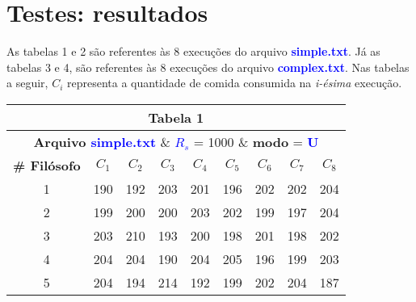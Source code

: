 \documentclass[11pt]{article}
\begin{document}
\section{Testes: resultados}

As tabelas 1 e 2 são referentes às 8 execuções do arquivo \textbf{\textcolor{blue}{simple.txt}}. Já as tabelas 3 e 4, são referentes às 8 execuções do arquivo \textbf{\textcolor{blue}{complex.txt}}. Nas tabelas a seguir, \textbf{$C_i$} representa a quantidade de comida consumida na \textit{i-ésima} execução.

\begin{table}[!h]
	\begin{center}
		\begin{tabular}{| c | c | c | c | c | c | c | c | c |}
		\hline
		\multicolumn{9}{|c|}{\textbf{Tabela 1}} \\ \hline
		\multicolumn{9}{|c|}{\textbf{Arquivo \textcolor{blue}{simple.txt}} \& \textbf{\textcolor{blue}{$R_s$}} = 1000 \& \textbf{modo} = \textbf{\textcolor{blue}{U}}} \\
		\hline
			\textbf{\# Filósofo} & \textbf{$C_1$} & \textbf{$C_2$} & \textbf{$C_3$} & \textbf{$C_4$} & \textbf{$C_5$} & \textbf{$C_6$} & \textbf{$C_7$} & \textbf{$C_8$} \\ \hline
			1 & 190 & 192 & 203 & 201 & 196 & 202 & 202 & 204 \\ \hline
			2 & 199 & 200 & 200 & 203 & 202 & 199 & 197 & 204 \\ \hline
			3 & 203 & 210 & 193 & 200 & 198 & 201 & 198 & 202 \\ \hline
			4 & 204 & 204 & 190 & 204 & 205 & 196 & 199 & 203 \\ \hline
			5 & 204 & 194 & 214 & 192 & 199 & 202 & 204 & 187 \\ \hline
		\end{tabular}
	\end{center}
\end{table}

\pagebreak
\end{document}
